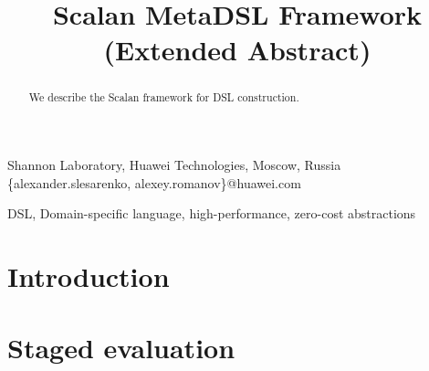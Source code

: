 \documentclass[preprint]{sigplanconf}
\begin{document}
\setlength{\pdfpageheight}{\paperheight}
\setlength{\pdfpagewidth}{\paperwidth}






\title{Scalan MetaDSL Framework (Extended Abstract)}

           {Shannon Laboratory, Huawei Technologies, Moscow, Russia}
           {\{alexander.slesarenko, alexey.romanov\}@huawei.com}

\maketitle

\begin{abstract}
We describe the Scalan framework for DSL construction.
\end{abstract}



\keywords
DSL, Domain-specific language, high-performance, zero-cost abstractions

\section{Introduction}

\section{Staged evaluation}
\end{document}
